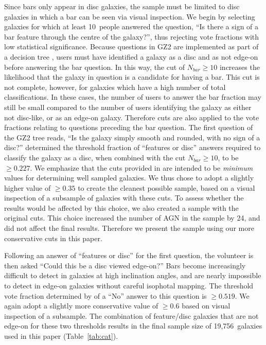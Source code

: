 Since bars only appear in disc galaxies, the sample must be limited to disc galaxies in which a bar can be seen via visual inspection. We begin by selecting galaxies for which at least 10~people answered the question, ``Is there a sign of a bar feature through the centre of the galaxy?'', thus rejecting vote fractions with low statistical significance. Because questions in GZ2 are implemented as part of a decision tree \citep{Kyle}, users must have identified a galaxy as a disc and as not edge-on before answering the bar question. In this way, the cut of $N_{bar}\ge10$ increases the likelihood that the galaxy in question is a candidate for having a bar. This cut is not complete, however, for galaxies which have a high number of total classifications. In these cases, the number of users to answer the bar fraction may still be small compared to the number of users identifying the galaxy as either not disc-like, or as an edge-on galaxy. Therefore cuts are also applied to the vote fractions relating to questions preceding the bar question. The first question of the GZ2 tree reads, ``Is the galaxy simply smooth and rounded, with no sign of a disc?'' \citet{Kyle} determined the threshold fraction of ``features or disc'' answers required to classify the galaxy as a disc, when combined with the cut $N_{bar}\ge10$, to be \pfeatures$\ge0.227$. We emphasize that the cuts provided in \citet{Kyle} are intended to be \emph{minimum} values for determining well sampled galaxies. We thus chose to adopt a slightly higher value of \pfeatures$\ge0.35$ to create the cleanest possible sample, based on a visual inspection of a subsample of galaxies with these cuts. To assess whether the results would be affected by this choice, we also created a sample with the original \citet{Kyle} cuts. This choice increased the number of AGN in the sample by 24, and did not affect the final results. Therefore we present the sample using our more conservative cuts in this paper. 

Following an answer of ``features or disc'' for the first question, the volunteer is then asked ``Could this be a disc viewed edge-on?'' Bars become increasingly difficult to detect in galaxies at high inclination angles, and are nearly impossible to detect in edge-on galaxies without careful isophotal mapping. The threshold vote fraction determined by \citet{Kyle} of a ``No'' answer to this question is \pnotedgeon$\ge0.519$. We again adopt a slightly more conservative value of \pnotedgeon$\ge0.6$ based on visual inspection of a subsample. The combination of feature/disc galaxies that are not edge-on for these two thresholds results in the final sample size of 19,756~galaxies used in this paper (Table~\ref{tab:cat}). 

